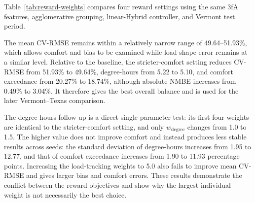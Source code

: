 Table~\ref{tab:reward-weights} compares four reward settings using the same 3fA
features, agglomerative grouping, linear-Hybrid controller, and Vermont test
period. 

\begin{table}[!htbp]
\small
\begin{center}
\end{center}
\caption{Three-seed mean comparison of the reward-weight settings in Vermont.}
\label{tab:reward-weights}
\end{table}

The mean CV-RMSE remains within a relatively narrow range of 49.64--51.93\%,
which allows comfort and bias to be examined while load-shape error remains at
a similar level. Relative to the baseline, the stricter-comfort setting reduces
CV-RMSE from 51.93\% to 49.64\%, degree-hours from 5.22 to 5.10, and comfort
exceedance from 20.27\% to 18.74\%, although absolute NMBE increases from 0.49\%
to 3.04\%. It therefore gives the best overall balance and is used for the later
Vermont--Texas comparison.

The degree-hours follow-up is a direct single-parameter test: its first four
weights are identical to the stricter-comfort setting, and only
$w_{\mathrm{degree}}$ changes from 1.0 to 1.5. The higher value does not improve
comfort and instead produces less stable results across seeds: the standard
deviation of degree-hours increases from 1.95 to 12.77, and that of comfort
exceedance increases from 1.90 to 11.93 percentage points. Increasing the
load-tracking weights to 5.0 also fails to improve mean CV-RMSE and gives larger
bias and comfort errors. These results demonstrate the conflict between the
reward objectives and show why the largest individual weight is not necessarily
the best choice.

